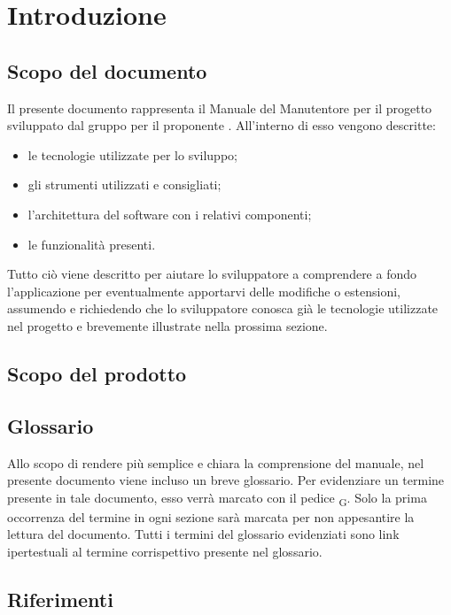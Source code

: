 \newpage

\section{Introduzione}
	\subsection{Scopo del documento}
	Il presente documento rappresenta il Manuale del Manutentore per il progetto \progetto{} sviluppato dal gruppo \zephyrus{} per il proponente \riskapp. 
	All'interno di esso vengono descritte:
	\begin{itemize}
		\item le tecnologie utilizzate per lo sviluppo;
		\item gli strumenti utilizzati e consigliati;
		\item l'architettura del software con i relativi componenti;
		\item le funzionalità presenti.
	\end{itemize}
	Tutto ciò viene descritto per aiutare lo sviluppatore a comprendere a fondo l'applicazione per eventualmente apportarvi delle modifiche o estensioni, assumendo e richiedendo che lo sviluppatore conosca già le tecnologie utilizzate nel progetto e brevemente illustrate nella prossima sezione.
	\subsection{Scopo del prodotto}
	\introScopo
	\subsection{Glossario}
	Allo scopo di rendere più semplice e chiara la comprensione del manuale, nel presente documento viene incluso un breve glossario.
	Per evidenziare un termine presente in tale documento, esso verrà marcato con il pedice \textsubscript{G}. Solo la prima occorrenza del termine in ogni sezione sarà marcata per non appesantire la lettura del documento.
	Tutti i termini del glossario evidenziati sono link ipertestuali al termine corrispettivo presente nel glossario.
	\subsection{Riferimenti}
